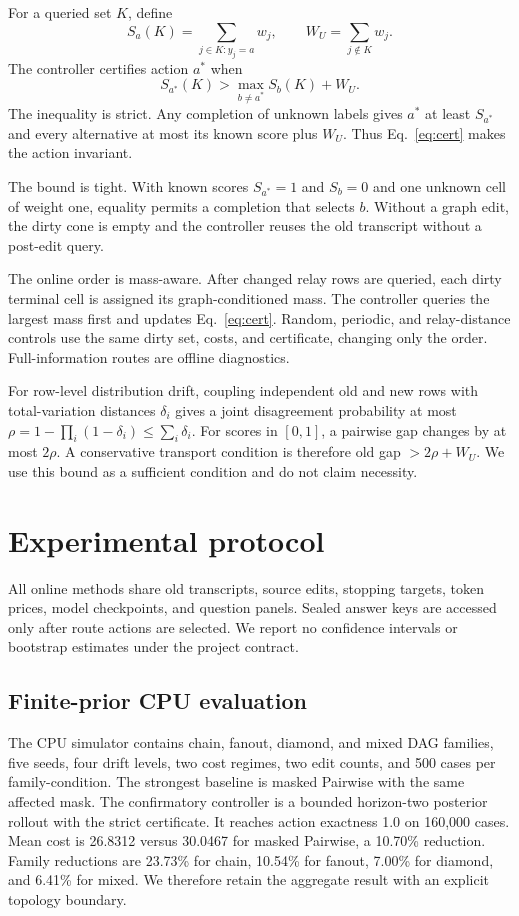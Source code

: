 \documentclass[11pt]{article}
\begin{document}
For a queried set $K$, define
\begin{equation}
S_a(K)=\sum_{j\in K:y_j=a} w_j,\qquad W_U=\sum_{j\notin K}w_j.
\end{equation}
The controller certifies action $a^*$ when
\begin{equation}
S_{a^*}(K)>\max_{b\neq a^*}S_b(K)+W_U.\label{eq:cert}
\end{equation}
The inequality is strict. Any completion of unknown labels gives $a^*$ at least $S_{a^*}$ and every alternative at most its known score plus $W_U$. Thus Eq.~\ref{eq:cert} makes the action invariant.

The bound is tight. With known scores $S_{a^*}=1$ and $S_b=0$ and one unknown cell of weight one, equality permits a completion that selects $b$. Without a graph edit, the dirty cone is empty and the controller reuses the old transcript without a post-edit query.

The online order is mass-aware. After changed relay rows are queried, each dirty terminal cell is assigned its graph-conditioned mass. The controller queries the largest mass first and updates Eq.~\ref{eq:cert}. Random, periodic, and relay-distance controls use the same dirty set, costs, and certificate, changing only the order. Full-information routes are offline diagnostics.

For row-level distribution drift, coupling independent old and new rows with total-variation distances $\delta_i$ gives a joint disagreement probability at most $\rho=1-\prod_i(1-\delta_i)\leq\sum_i\delta_i$. For scores in $[0,1]$, a pairwise gap changes by at most $2\rho$. A conservative transport condition is therefore old gap $>2\rho+W_U$. We use this bound as a sufficient condition and do not claim necessity.

\section{Experimental protocol}
All online methods share old transcripts, source edits, stopping targets, token prices, model checkpoints, and question panels. Sealed answer keys are accessed only after route actions are selected. We report no confidence intervals or bootstrap estimates under the project contract.

\subsection{Finite-prior CPU evaluation}
The CPU simulator contains chain, fanout, diamond, and mixed DAG families, five seeds, four drift levels, two cost regimes, two edit counts, and 500 cases per family-condition. The strongest baseline is masked Pairwise with the same affected mask. The confirmatory controller is a bounded horizon-two posterior rollout with the strict certificate. It reaches action exactness 1.0 on 160,000 cases. Mean cost is 26.8312 versus 30.0467 for masked Pairwise, a 10.70\% reduction. Family reductions are 23.73\% for chain, 10.54\% for fanout, 7.00\% for diamond, and 6.41\% for mixed. We therefore retain the aggregate result with an explicit topology boundary.
\end{document}
